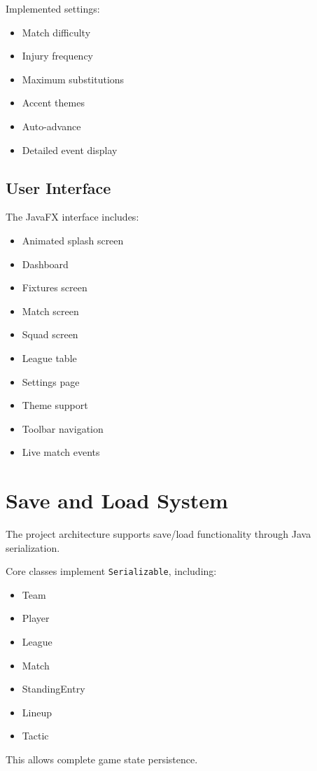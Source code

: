 \documentclass[11pt,a4paper]{article}
\begin{document}
Implemented settings:
\begin{itemize}
\item Match difficulty
\item Injury frequency
\item Maximum substitutions
\item Accent themes
\item Auto-advance
\item Detailed event display
\end{itemize}

\subsection{User Interface}

The JavaFX interface includes:
\begin{itemize}
\item Animated splash screen
\item Dashboard
\item Fixtures screen
\item Match screen
\item Squad screen
\item League table
\item Settings page
\item Theme support
\item Toolbar navigation
\item Live match events
\end{itemize}

\section{Save and Load System}

The project architecture supports save/load functionality through Java serialization.

Core classes implement \texttt{Serializable}, including:
\begin{itemize}
\item Team
\item Player
\item League
\item Match
\item StandingEntry
\item Lineup
\item Tactic
\end{itemize}

This allows complete game state persistence.
\end{document}
